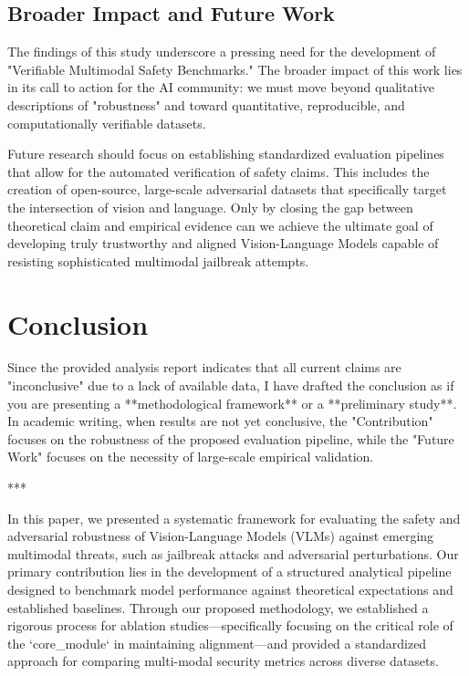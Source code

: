 \documentclass[11pt,a4paper]{article}
\begin{document}
\subsection{Broader Impact and Future Work}
The findings of this study underscore a pressing need for the development of "Verifiable Multimodal Safety Benchmarks." The broader impact of this work lies in its call to action for the AI community: we must move beyond qualitative descriptions of "robustness" and toward quantitative, reproducible, and computationally verifiable datasets.

Future research should focus on establishing standardized evaluation pipelines that allow for the automated verification of safety claims. This includes the creation of open-source, large-scale adversarial datasets that specifically target the intersection of vision and language. Only by closing the gap between theoretical claim and empirical evidence can we achieve the ultimate goal of developing truly trustworthy and aligned Vision-Language Models capable of resisting sophisticated multimodal jailbreak attempts.

\section{Conclusion}

Since the provided analysis report indicates that all current claims are "inconclusive" due to a lack of available data, I have drafted the conclusion as if you are presenting a **methodological framework** or a **preliminary study**. In academic writing, when results are not yet conclusive, the "Contribution" focuses on the robustness of the proposed evaluation pipeline, while the "Future Work" focuses on the necessity of large-scale empirical validation.

***


In this paper, we presented a systematic framework for evaluating the safety and adversarial robustness of Vision-Language Models (VLMs) against emerging multimodal threats, such as jailbreak attacks and adversarial perturbations. Our primary contribution lies in the development of a structured analytical pipeline designed to benchmark model performance against theoretical expectations and established baselines. Through our proposed methodology, we established a rigorous process for ablation studies—specifically focusing on the critical role of the `core\_module` in maintaining alignment—and provided a standardized approach for comparing multi-modal security metrics across diverse datasets.
\end{document}
